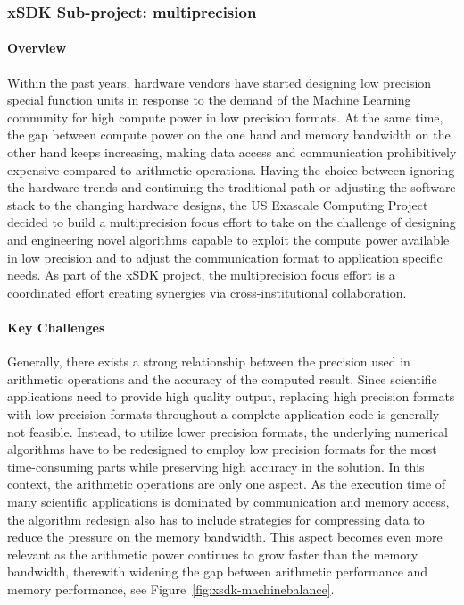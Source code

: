 \subsubsection{ xSDK Sub-project: multiprecision} 
\paragraph{Overview} 
Within the past years, hardware vendors have started designing low precision special function units 
in response to the demand of the Machine Learning community for high compute power
in low precision formats. At the same time, the gap between compute power
on the one hand and memory bandwidth on the other hand keeps increasing, 
making data access and communication prohibitively expensive compared to arithmetic operations.
Having the choice between ignoring the hardware trends and continuing the traditional path
or adjusting the software stack to the changing hardware designs, the US Exascale Computing Project
decided to build a multiprecision focus effort to take on the challenge of designing and engineering novel algorithms capable to exploit the compute power available in low precision and to adjust the communication format to application specific needs.
As part of the xSDK project, the multiprecision focus effort is a coordinated effort creating synergies via cross-institutional collaboration.

\paragraph{Key Challenges}
Generally, there exists a strong relationship between the precision used in arithmetic operations and the accuracy of the computed result. Since scientific applications need to provide high quality output, replacing high precision formats with low precision formats throughout a complete application code is generally not feasible. Instead, to utilize lower precision formats, the underlying numerical algorithms have to be redesigned to employ low precision formats for the most time-consuming parts while preserving  high accuracy in the solution. In this context, the arithmetic operations are only one aspect. As the execution time of many scientific applications is dominated by communication and memory access, the algorithm redesign also has to include strategies for compressing data to reduce the pressure on the memory bandwidth. This aspect becomes even more relevant as the arithmetic power continues to grow faster than the memory bandwidth, therewith widening the gap between arithmetic performance and memory performance, see Figure~\ref{fig:xsdk-machinebalance}.

